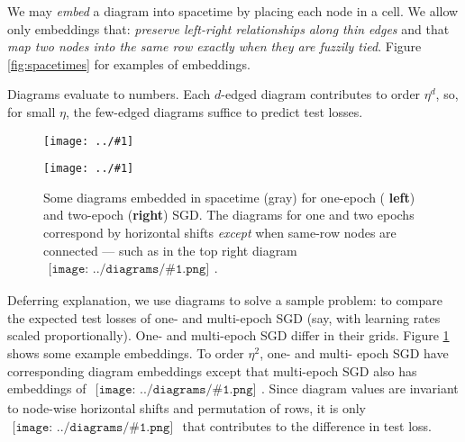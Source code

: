 \documentclass{article}
\newcommand{\plotmooh}[3]{
    \texttt{[image: ../\#1]}
}
\newcommand{\sdia}[1]{\begin{gathered}\texttt{[image: ../diagrams/\#1.png]}\end{gathered}}
\begin{document}
        We may \emph{embed} a diagram into spacetime by placing each node in a
        cell.  We allow only embeddings that:
            \emph{preserve left-right relationships along thin edges}
            and that
            \emph{map two nodes into the same row exactly when they are fuzzily tied}.
        Figure \ref{fig:spacetimes} for examples of embeddings. 

        Diagrams evaluate to numbers.  Each $d$-edged diagram contributes to
        order $\eta^d$, so, for small $\eta$, the few-edged diagrams suffice to
        predict test losses.


        \begin{figure}[h!] 
            \centering  
            \plotmooh{diagrams/spacetime-c}{0.32\columnwidth}{0.32\columnwidth}
            \plotmooh{diagrams/spacetime-d}{0.64\columnwidth}{0.32\columnwidth}
            \caption{
                Some diagrams embedded in spacetime (gray) for one-epoch ({\bf
                left}) and two-epoch ({\bf right}) SGD.  The diagrams for one
                and two epochs correspond by horizontal shifts \emph{except}
                when same-row nodes are connected --- such as in the top right
                diagram $\sdia{c(01-2)(01-12)}$. 
            }
            \label{fig:epoch}
        \end{figure}

        Deferring explanation, we use diagrams to solve a sample problem: to
        compare the expected test losses of one- and multi-epoch SGD (say, with
        learning rates scaled proportionally).
        One- and multi-epoch SGD differ in their grids.  Figure \ref{fig:epoch}
        shows some example embeddings.
        To order $\eta^2$, one- and multi- epoch SGD have corresponding diagram
        embeddings except that multi-epoch SGD also has embeddings of
        $\sdia{c(01-2)(01-12)}$.  Since diagram values are invariant to
        node-wise horizontal shifts and permutation of rows, it is only
        $\sdia{c(01-2)(01-12)}$ that contributes to the difference in test
        loss.  
\end{document}
